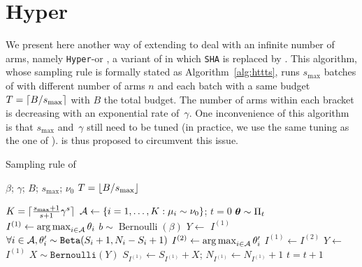 \section{Hyper \TTTS}\label{app:dttts.httts}

We present here another way of extending \TTTS to deal with an infinite number of arms, namely \texttt{Hyper}-\TTTS or \HTTTS, a variant of \Hyperband in which \texttt{SHA} is replaced by \TTTS. This algorithm, whose sampling rule is formally stated as Algorithm~\ref{alg:httts}, runs $s_{\max}$ batches of \TTTS with different number of arms $n$ and each batch with a same budget $T=\lceil B/s_{\max}\rceil$ with $B$ the total budget. The number of arms within each bracket is decreasing with an exponential rate of~$\gamma$. One inconvenience of this algorithm is that $s_{\max}$ and~$\gamma$ still need to be tuned (in practice, we use the same tuning as the one of \Hyperband). \DTTTS is thus proposed to circumvent this issue. 

\begin{algorithm}[ht]
\centering
\caption{Sampling rule of \HTTTS{}}
\label{alg:httts}
\begin{algorithmic}[1] %
     $\beta$; $\gamma$; $B$; $s_{\operatorname{max}}$; $\nu_0$
     $T=\lfloor B/s_{\operatorname{max}}\rfloor$

    	\State $K = \lceil\frac{s_{\operatorname{max}}+1}{s+1}\gamma^s\rceil$
    	\State $\mathcal{A} \leftarrow \{i=1,\ldots,K: \mu_i\sim\nu_0\}$; $t=0$
    		\State {} ${\boldsymbol \theta} \sim \Pi_t$
            \State $I^{(1)} \leftarrow \operatorname*{arg\,max}_{i\in\mathcal{A}}\theta_i$
    	    \State {} $b \sim \operatorname{Bernoulli}(\beta)$
    	        \State $Y \leftarrow$  $I^{(1)}$
    	    \Else
    	            \State $\forall i\in\mathcal{A}, \theta_i' \sim \texttt{Beta}(S_i+1,N_i-S_i+1)$
    	            \State $I^{(2)} \leftarrow \operatorname*{arg\,max}_{i \in \mathcal{A}}\theta_i'$ 
    	        \EndWhile
    	        \State $I^{(1)} \gets I^{(2)}$
    		    \State $Y \leftarrow$  $I^{(1)}$
    	    \EndIf
    	    \State $X \sim \texttt{Bernoulli}(Y)$ 
    	    \State $S_{I^{(1)}} \gets S_{I^{(1)}} + X$; $N_{I^{(1)}} \gets N_{I^{(1)}} + 1$
    		\State $t = t+1$
        \EndWhile
    \EndFor
\end{algorithmic}
\end{algorithm}
